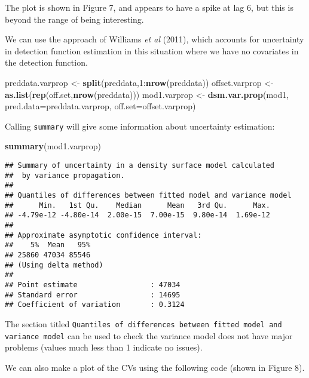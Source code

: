 \documentclass[]{article}
\newenvironment{Shaded}{}{}
\newcommand{\KeywordTok}[1]{\textcolor[rgb]{0.00,0.44,0.13}{\textbf{{#1}}}}
\newcommand{\DataTypeTok}[1]{\textcolor[rgb]{0.56,0.13,0.00}{{#1}}}
\newcommand{\DecValTok}[1]{\textcolor[rgb]{0.25,0.63,0.44}{{#1}}}
\newcommand{\StringTok}[1]{\textcolor[rgb]{0.25,0.44,0.63}{{#1}}}
\newcommand{\NormalTok}[1]{{#1}}
\begin{document}
The plot is shown in Figure 7, and appears to have a spike at lag 6, but
this is beyond the range of being interesting.

We can use the approach of Williams \emph{et al} (2011), which accounts
for uncertainty in detection function estimation in this situation where
we have no covariates in the detection function.

\begin{Shaded}
\begin{Highlighting}[]
\NormalTok{preddata.varprop <-}\StringTok{ }\KeywordTok{split}\NormalTok{(preddata,}\DecValTok{1}\NormalTok{:}\KeywordTok{nrow}\NormalTok{(preddata))}
\NormalTok{offset.varprop <-}\StringTok{ }\KeywordTok{as.list}\NormalTok{(}\KeywordTok{rep}\NormalTok{(off.set,}\KeywordTok{nrow}\NormalTok{(preddata)))}
\NormalTok{mod1.varprop <-}\StringTok{ }\KeywordTok{dsm.var.prop}\NormalTok{(mod1, }\DataTypeTok{pred.data=}\NormalTok{preddata.varprop,}
\DataTypeTok{off.set=}\NormalTok{offset.varprop)}
\end{Highlighting}
\end{Shaded}

Calling \texttt{summary} will give some information about uncertainty
estimation:

\begin{Shaded}
\begin{Highlighting}[]
\KeywordTok{summary}\NormalTok{(mod1.varprop)}
\end{Highlighting}
\end{Shaded}

\begin{verbatim}
## Summary of uncertainty in a density surface model calculated
##  by variance propagation.
## 
## Quantiles of differences between fitted model and variance model
##      Min.   1st Qu.    Median      Mean   3rd Qu.      Max. 
## -4.79e-12 -4.80e-14  2.00e-15  7.00e-15  9.80e-14  1.69e-12 
## 
## Approximate asymptotic confidence interval:
##    5%  Mean   95% 
## 25860 47034 85546 
## (Using delta method)
## 
## Point estimate                 : 47034 
## Standard error                 : 14695 
## Coefficient of variation       : 0.3124
\end{verbatim}

The section titled
\texttt{Quantiles of differences between fitted model and variance model}
can be used to check the variance model does not have major problems
(values much less than 1 indicate no issues).

We can also make a plot of the CVs using the following code (shown in
Figure 8).
\end{document}
